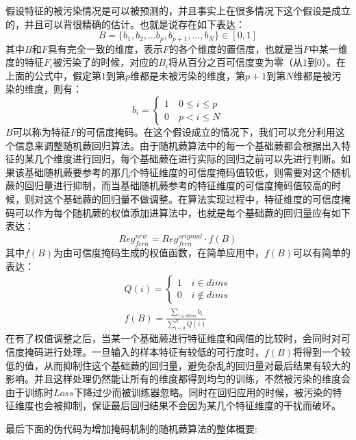 假设特征的被污染情况是可以被预测的，并且事实上在很多情况下这个假设是成立的，并且可以背很精确的估计。也就是说存在如下表达：
\begin{equation}
	B=\{b_1,b_2,...b_p,b_{p+1},...,b_N\}\in[0,1]
\end{equation}
其中$B$和$F$具有完全一致的维度，表示$F$的各个维度的置信度，也就是当$F$中某一维度的特征$F_i$被污染了的时候，对应的$B_i$将从百分之百可信度变为零（从1到0）。在上面的公式中，假定第$1$到第$p$维都是未被污染的维度，第$p+1$到第$N$维都是被污染的维度，则有：
\begin{equation}
b_i=
\begin{cases}
1\quad {0\leq i\leq p} \\
0\quad {p<i\leq N}
\end{cases}
\end{equation}
$B$可以称为特征$F$的可信度掩码。在这个假设成立的情况下，我们可以充分利用这个信息来调整随机蕨回归算法。由于随机蕨算法中的每一个基础蕨都会根据出入特征的某几个维度进行回归，每个基础蕨在进行实际的回归之前可以先进行判断。如果该基础随机蕨要参考的那几个特征维度的可信度掩码值较低，则需要对这个随机蕨的回归量进行抑制，而当基础随机蕨参考的特征维度的可信度掩码值较高的时候，则对这个基础蕨的回归量不做调整。在算法实现过程中，特征维度的可信度掩码可以作为每个随机蕨的权值添加进算法中，也就是每个基础蕨的回归量应有如下表达：
\begin{equation}
	Reg_{fern}^{new} = Reg_{fern}^{original}\cdot f(B)
\end{equation}
其中$f(B)$为由可信度掩码生成的权值函数，在简单应用中，$f(B)$可以有简单的表达：
\begin{equation}
\begin{aligned}
	Q(i)=
	\begin{cases}
		1\quad i\in dims \\
		0\quad i\not\in dims
	\end{cases} \\
	f(B)=\frac{\sum_{i\in dims} b_i}{\sum_{i=0}^{N} Q(i)}
\end{aligned}
\end{equation}
在有了权值调整之后，当某一个基础蕨进行特征维度和阈值的比较时，会同时对可信度掩码进行处理。一旦输入的样本特征有较低的可行度时，$f(B)$将得到一个较低的值，从而抑制住这个基础蕨的回归量，避免杂乱的回归量对最后结果有较大的影响。并且这样处理仍然能让所有的维度都得到均匀的训练，不然被污染的维度会由于训练时$Loss$下降过少而被训练器忽略。同时在回归应用的时候，被污染的特征维度也会被抑制，保证最后回归结果不会因为某几个特征维度的干扰而破坏。

最后下面的伪代码为增加掩码机制的随机蕨算法的整体概要:

